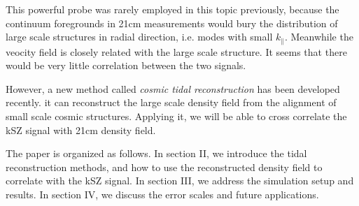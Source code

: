 This powerful probe was rarely employed in this topic previously, 
because the continuum foregrounds in 21cm measurements would bury the distribution of large scale structures in radial direction, i.e. modes with small $k_\parallel$.
Meanwhile the veocity field is closely related with the large scale structure. 
It seems that there would be very little correlation between the two signals.

However, a new method called {\it cosmic tidal reconstruction} has been 
developed recently\cite{2012:pen}\cite{2015:zhu}. 
it can reconstruct the large scale density field from the alignment of small 
scale cosmic structures. Applying it, we will be able to cross correlate the kSZ signal with 21cm density field.

The paper is organized as follows. In section II, we introduce the tidal reconstruction methods, and how to use the reconstructed density field to correlate with the kSZ signal.
In section III, we address the simulation setup and results. 
In section IV, we discuss the error scales and future applications.
